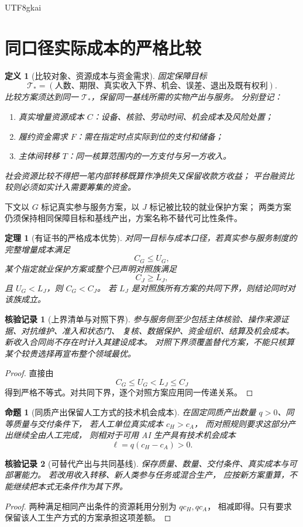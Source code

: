 \documentclass[12pt,a4paper,openany]{report}
\newtheorem{definition}{定义}[chapter]
\newtheorem{theorem}{定理}[chapter]
\newtheorem{proposition}{命题}[chapter]
\newtheorem{Certificate}{核验记录}[chapter]
\begin{document}
\begin{CJK*}{UTF8}{gkai}
\section{同口径实际成本的严格比较}
\begin{definition}[比较对象、资源成本与资金需求]
固定保障目标
\[
\mathcal T_*=
(\text{人数、期限、真实收入下界、机会、误差、退出及既有权利}).
\]
比较方案须达到同一 \(\mathcal T_*\)，保留同一基线所需的实物产出与服务。
分别登记：
\begin{enumerate}[label=(\arabic*)]
\item 真实增量资源成本 \(C\)：设备、核验、劳动时间、机会成本及风险处置；
\item 履约资金需求 \(F\)：需在指定时点实际到位的支付和储备；
\item 主体间转移 \(T\)：同一核算范围内的一方支付与另一方收入。
\end{enumerate}
社会资源比较不得把一笔内部转移既算作净损失又保留收款方收益；
平台融资比较则必须如实计入需要筹集的资金。
\end{definition}

下文以 \(G\) 标记真实参与服务方案，以 \(J\) 标记被比较的就业保护方案；
两类方案仍须保持相同保障目标和基线产出，方案名称不替代可比性条件。

\begin{theorem}[有证书的严格成本优势]
\label{thm:cost}
对同一目标与成本口径，若真实参与服务制度的完整增量成本满足
\[
C_G\le U_G,
\]
某个指定就业保护方案或整个已声明对照族满足
\[
C_J\ge L_J,
\]
且 \(U_G<L_J\)，则 \(C_G<C_J\)。
若 \(L_J\) 是对照族所有方案的共同下界，则结论同时对该族成立。
\end{theorem}
\begin{Certificate}[上界清单与对照下界]
参与服务侧至少包括主体核验、操作来源证据、对抗维护、准入和状态门、
复核、数据保护、资金组织、结算及机会成本。
新收入合同尚不存在时计入其建设成本。
对照下界须覆盖替代方案，不能只核算某个较贵选择再宣布整个领域最优。
\end{Certificate}
\begin{proof}
直接由
\[
C_G\le U_G<L_J\le C_J
\]
得到严格不等式。对共同下界，逐个对照方案应用同一传递关系。
\end{proof}

\begin{proposition}[同质产出保留人工方式的技术机会成本]
\label{prop:opportunity}
在固定同质产出数量 \(q>0\)、同等质量与交付条件下，
若人工单位真实成本 \(c_H>c_A\)，
而对照规则要求这部分产出继续全由人工完成，
则相对于可用 AI 生产具有技术机会成本
\[
\ell=q(c_H-c_A)>0.
\]
\end{proposition}
\begin{Certificate}[可替代产出与共同基线]
保存质量、数量、交付条件、真实成本与可部署能力。
若改用收入转移、新人类参与任务或混合生产，
应按新方案重算，不能继续把本式无条件作为其下界。
\end{Certificate}
\begin{proof}
两种满足相同产出条件的资源耗用分别为 \(qc_H,qc_A\)，
相减即得。只有要求保留该人工生产方式的方案承担这项差额。
\end{proof}


\end{CJK*}
\end{document}
